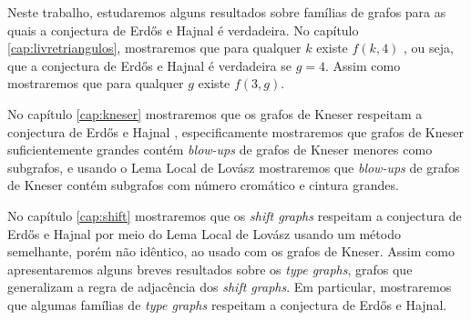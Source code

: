 Neste trabalho, estudaremos alguns resultados sobre famílias de grafos para as quais a conjectura de Erd\H{o}s e Hajnal é verdadeira. No capítulo \ref{cap:livretriangulos}, mostraremos que para qualquer $k$ existe $f(k,4)$ \cite{rodl1977chromatic}, ou seja, que a conjectura de Erd\H{o}s e Hajnal é verdadeira se $g=4$. Assim como mostraremos que para qualquer $g$ existe $f(3,g)$.

No capítulo \ref{cap:kneser} mostraremos que os grafos de Kneser respeitam a conjectura de Erd\H{o}s e Hajnal \cite{mohar2015triangle}, especificamente mostraremos que grafos de Kneser suficientemente grandes contém \textit{blow-ups} de grafos de Kneser menores como subgrafos, e usando o Lema Local de Lovász mostraremos que \textit{blow-ups} de grafos de Kneser contém subgrafos com número cromático e cintura grandes.

No capítulo \ref{cap:shift} mostraremos que os \textit{shift graphs} respeitam a conjectura de Erd\H{o}s e Hajnal \cite{gabor2018cepa} por meio do Lema Local de Lovász usando um método semelhante, porém não idêntico, ao usado com os grafos de Kneser. Assim como apresentaremos alguns breves resultados sobre os \textit{type graphs}, grafos que generalizam a regra de adjacência dos \textit{shift graphs}. Em particular, mostraremos que algumas famílias de \textit{type graphs} respeitam a conjectura de Erd\H{o}s e Hajnal.